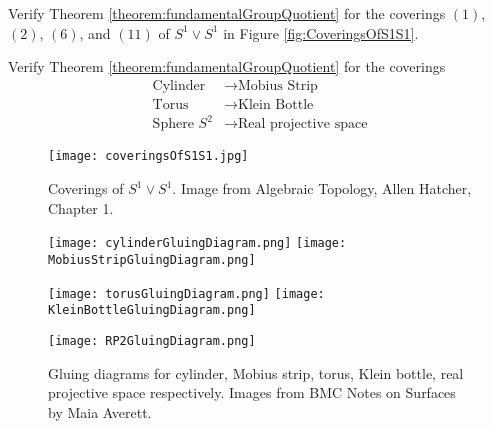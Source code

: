 \begin{qbox}
  Verify Theorem \ref{theorem:fundamentalGroupQuotient} for the coverings $(1)$, $(2)$, $(6)$, and $(11)$ of $S^1 \vee S^1$ in Figure \ref{fig:CoveringsOfS1S1}.
\end{qbox}

\begin{qbox}
  Verify Theorem \ref{theorem:fundamentalGroupQuotient} for the coverings
  \begin{align*}
    \mbox{Cylinder} &\longrightarrow \mbox{Mobius Strip} \\
    \mbox{Torus} &\longrightarrow \mbox{Klein Bottle} \\
    \mbox{Sphere } S^2 &\longrightarrow \mbox{Real projective space}
  \end{align*}
\end{qbox}







\begin{figure}[p]
\centering
  \texttt{[image: coveringsOfS1S1.jpg]}
  \caption*{Coverings of $S^1 \vee S^1$. Image from Algebraic Topology, Allen Hatcher, Chapter 1.}
\end{figure}

\begin{figure}[p]
  \centering
  \texttt{[image: cylinderGluingDiagram.png]}
  \texttt{[image: MobiusStripGluingDiagram.png]}

  \texttt{[image: torusGluingDiagram.png]}
  \texttt{[image: KleinBottleGluingDiagram.png]}

  \texttt{[image: RP2GluingDiagram.png]}
  \caption*{Gluing diagrams for cylinder, Mobius strip, torus, Klein bottle, real projective space respectively. Images from BMC Notes on Surfaces by Maia Averett.}
\end{figure}
